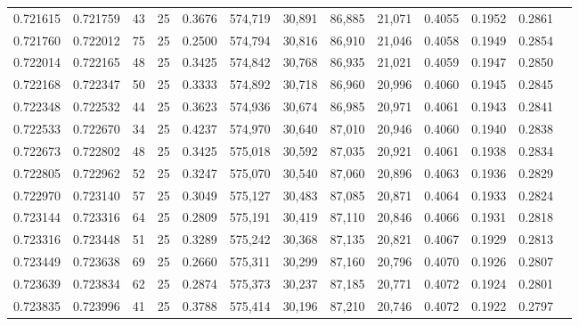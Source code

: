 \begin{tabular}{rrrrrrrrrrrrr}
0.721615 & 0.721759 &    43 &  25 &                                     0.3676 & 574,719 &  30,891 &  86,885 &  21,071 & 0.4055 & 0.1952 & 0.2861 \\
0.721760 & 0.722012 &    75 &  25 &                                     0.2500 & 574,794 &  30,816 &  86,910 &  21,046 & 0.4058 & 0.1949 & 0.2854 \\
0.722014 & 0.722165 &    48 &  25 &                                     0.3425 & 574,842 &  30,768 &  86,935 &  21,021 & 0.4059 & 0.1947 & 0.2850 \\
0.722168 & 0.722347 &    50 &  25 &                                     0.3333 & 574,892 &  30,718 &  86,960 &  20,996 & 0.4060 & 0.1945 & 0.2845 \\
0.722348 & 0.722532 &    44 &  25 &                                     0.3623 & 574,936 &  30,674 &  86,985 &  20,971 & 0.4061 & 0.1943 & 0.2841 \\
0.722533 & 0.722670 &    34 &  25 &                                     0.4237 & 574,970 &  30,640 &  87,010 &  20,946 & 0.4060 & 0.1940 & 0.2838 \\
0.722673 & 0.722802 &    48 &  25 &                                     0.3425 & 575,018 &  30,592 &  87,035 &  20,921 & 0.4061 & 0.1938 & 0.2834 \\
0.722805 & 0.722962 &    52 &  25 &                                     0.3247 & 575,070 &  30,540 &  87,060 &  20,896 & 0.4063 & 0.1936 & 0.2829 \\
0.722970 & 0.723140 &    57 &  25 &                                     0.3049 & 575,127 &  30,483 &  87,085 &  20,871 & 0.4064 & 0.1933 & 0.2824 \\
0.723144 & 0.723316 &    64 &  25 &                                     0.2809 & 575,191 &  30,419 &  87,110 &  20,846 & 0.4066 & 0.1931 & 0.2818 \\
0.723316 & 0.723448 &    51 &  25 &                                     0.3289 & 575,242 &  30,368 &  87,135 &  20,821 & 0.4067 & 0.1929 & 0.2813 \\
0.723449 & 0.723638 &    69 &  25 &                                     0.2660 & 575,311 &  30,299 &  87,160 &  20,796 & 0.4070 & 0.1926 & 0.2807 \\
0.723639 & 0.723834 &    62 &  25 &                                     0.2874 & 575,373 &  30,237 &  87,185 &  20,771 & 0.4072 & 0.1924 & 0.2801 \\
0.723835 & 0.723996 &    41 &  25 &                                     0.3788 & 575,414 &  30,196 &  87,210 &  20,746 & 0.4072 & 0.1922 & 0.2797 \\

\end{tabular}
